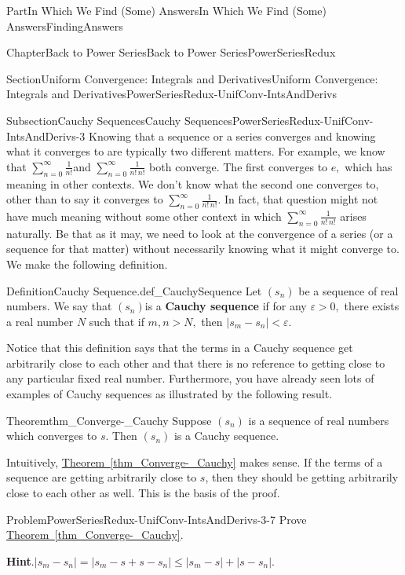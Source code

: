 \documentclass[oneside,10pt,]{book}
\newcommand{\blocktitlefont}{\relax}
\newcommand{\xreffont}{\relax}
\newcommand{\terminology}[1]{\textbf{#1}}
\numberwithin{equation}{part}
\newcommand{\abs}[1]{\left|#1\right|}
\newcommand{\eps}{\varepsilon}
\newcommand{\lt}{<}
\begin{document}
\begin{partptx}{Part}{In Which We Find (Some) Answers}{}{In Which We Find (Some) Answers}{}{}{FindingAnswers}
\begin{chapterptx}{Chapter}{Back to Power Series}{}{Back to Power Series}{}{}{PowerSeriesRedux}
\begin{sectionptx}{Section}{Uniform Convergence: Integrals and Derivatives}{}{Uniform Convergence: Integrals and Derivatives}{}{}{PowerSeriesRedux-UnifConv-IntsAndDerivs}
\begin{subsectionptx}{Subsection}{Cauchy Sequences}{}{Cauchy Sequences}{}{}{PowerSeriesRedux-UnifConv-IntsAndDerivs-3}
Knowing that a sequence or a series converges and knowing what it converges to are typically two different matters.  For example, we know that \(\sum_{n=0}^\infty\frac{1}{n!}\)and \(\sum_{n=0}^\infty\frac{1}{n!\,n!}\) both converge.  The first converges to \(e,\) which has meaning in other contexts.  We don't know what the second one converges to, other than to say it converges to \(\sum_{n=0}^\infty\frac{1}{n!\,n!}\).  In fact, that question might not have much meaning without some other context in which \(\sum_{n=0}^\infty\frac{1}{n!\,n!}\) arises naturally.  Be that as it may, we need to look at the convergence of a series (or a sequence for that matter) without necessarily knowing what it might converge to.  We make the following definition.%
\begin{definition}{Definition}{Cauchy Sequence.}{def_CauchySequence}%
%
%
%
Let \(\left(s_n\right)\) be a sequence of real numbers. We say that \(\left(s_n\right)\)is a \terminology{Cauchy sequence} if for any \(\eps>0,\) there exists a real number \(N\) such that if \(m,n>N,\) then \(|s_m-s_n|\lt \eps\).%
\end{definition}
Notice that this definition says that the terms in a Cauchy sequence get arbitrarily close to each other and that there is no reference to getting close to any particular fixed real number.  Furthermore, you have already seen lots of examples of Cauchy sequences as illustrated by the following result.%
\begin{theorem}{Theorem}{}{}{thm_Converge-_Cauchy}%
%
%
Suppose \(\left(s_n\right)\) is a sequence of real numbers which converges to \(s\).  Then \(\left(s_n\right)\) is a Cauchy sequence.%
\end{theorem}
Intuitively, \hyperref[thm_Converge-_Cauchy]{Theorem~{\xreffont\ref{thm_Converge-_Cauchy}}} makes sense.  If the terms of a sequence are getting arbitrarily close to \(s\), then they should be getting arbitrarily close to each other as well.  This is the basis of the proof.%
\begin{problem}{Problem}{}{PowerSeriesRedux-UnifConv-IntsAndDerivs-3-7}%
Prove \hyperref[thm_Converge-_Cauchy]{Theorem~{\xreffont\ref{thm_Converge-_Cauchy}}}.%
\par\smallskip%
\noindent\textbf{\blocktitlefont Hint}.\hypertarget{PowerSeriesRedux-UnifConv-IntsAndDerivs-3-7-4}{}\quad{}\(\abs{s_m-s_n}=\abs{s_m-s+s-s_n}\leq \abs{s_m-s}+\abs{s-s_n}\).%

\end{problem}
\end{subsectionptx}
\end{sectionptx}
\end{chapterptx}
\end{partptx}
\end{document}

